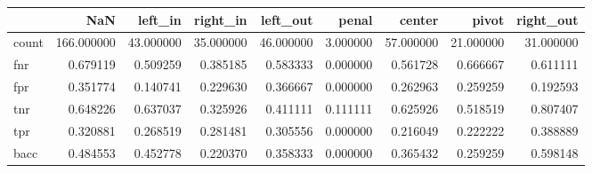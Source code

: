 \begin{tabular}{lrrrrrrrr}
\toprule
{} &         NaN &    left\_in &   right\_in &   left\_out &     penal &     center &      pivot &  right\_out \\
\midrule
count &  166.000000 &  43.000000 &  35.000000 &  46.000000 &  3.000000 &  57.000000 &  21.000000 &  31.000000 \\
fnr   &    0.679119 &   0.509259 &   0.385185 &   0.583333 &  0.000000 &   0.561728 &   0.666667 &   0.611111 \\
fpr   &    0.351774 &   0.140741 &   0.229630 &   0.366667 &  0.000000 &   0.262963 &   0.259259 &   0.192593 \\
tnr   &    0.648226 &   0.637037 &   0.325926 &   0.411111 &  0.111111 &   0.625926 &   0.518519 &   0.807407 \\
tpr   &    0.320881 &   0.268519 &   0.281481 &   0.305556 &  0.000000 &   0.216049 &   0.222222 &   0.388889 \\
bacc  &    0.484553 &   0.452778 &   0.220370 &   0.358333 &  0.000000 &   0.365432 &   0.259259 &   0.598148 \\
\bottomrule
\end{tabular}
